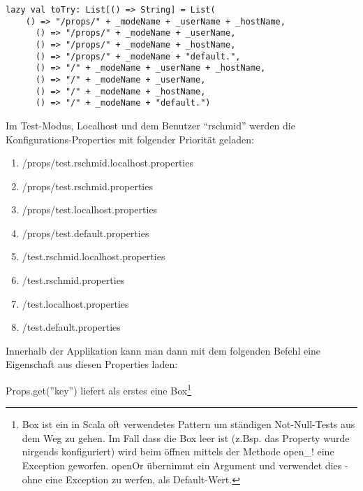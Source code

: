 \begin{lstlisting}[caption=Konfigurationsschema von .properties-Dateien im Lift Framework]
lazy val toTry: List[() => String] = List(
    () => "/props/" + _modeName + _userName + _hostName,
      () => "/props/" + _modeName + _userName,
      () => "/props/" + _modeName + _hostName,
      () => "/props/" + _modeName + "default.",
      () => "/" + _modeName + _userName + _hostName,
      () => "/" + _modeName + _userName,
      () => "/" + _modeName + _hostName,
      () => "/" + _modeName + "default.")
\end{lstlisting}

Im Test-Modus, Localhost und dem Benutzer ``rschmid'' werden die Konfigurations-Properties mit folgender Priorit\"at geladen:

\begin{enumerate}
\item /props/test.rschmid.localhost.properties
\item /props/test.rschmid.properties
\item /props/test.localhost.properties
\item /props/test.default.properties
\item /test.rschmid.localhost.properties
\item /test.rschmid.properties
\item /test.localhost.properties
\item /test.default.properties
\end{enumerate}

Innerhalb der Applikation kann man dann mit dem folgenden Befehl eine Eigenschaft aus diesen Properties laden:


Props.get(''key'') liefert als erstes eine Box\footnote{Box ist ein in Scala oft verwendetes Pattern um st\"andigen Not-Null-Tests aus dem Weg zu gehen. Im Fall dass die Box leer ist  (z.Bsp. das Property wurde nirgends konfiguriert) wird beim \"offnen mittels der Methode open\_! eine Exception geworfen. openOr \"ubernimmt ein Argument und verwendet dies - ohne eine Exception zu werfen, als Default-Wert.}


